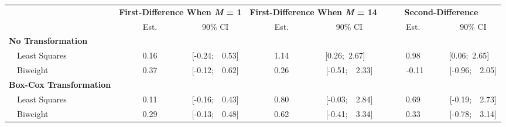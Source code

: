 %
\begin{center}
\begin{tabular}{|l||c|c||c|c||c|c|} \hline
\multicolumn{1}{|l||}{\bf }&\multicolumn{2}{c||}{\bf First-Difference When \textit{M} = 1}&\multicolumn{2}{c||}{\bf First-Difference When \textit{M} = 14}&\multicolumn{2}{c|}{\bf Second-Difference}\\ \cline{2-7}
\multicolumn{1}{|l||}{}&\multicolumn{1}{c|}{Est.}&\multicolumn{1}{c||}{90\% CI}&\multicolumn{1}{c|}{Est.}&\multicolumn{1}{c||}{90\% CI}&\multicolumn{1}{c|}{Est.}&\multicolumn{1}{c|}{90\% CI}\\ \hline
{\bf No Transformation}&&&&&&\\
~~Least Squares&~~~~~0.16~~~~~&[-0.24;~~0.53]&~~~~~1.14~~~~~&[0.26;~2.67]~~&~~~~~0.98~~~~~&[0.06;~2.65]~~\\ 
~~Biweight&~~~~~0.37~~~~~&[-0.12;~~0.62]&~~~~~0.26~~~~~&[-0.51;~~2.33]&~~~~~-0.11~~~~&[-0.96;~~2.05]\\ \hline
{\bf Box-Cox Transformation}&&&&&&\\
~~Least Squares&~~~~~0.11~~~~~&[-0.16;~~0.43]&~~~~~0.80~~~~~&[-0.03;~~2.84]&~~~~~0.69~~~~~&[-0.19;~~2.73]\\ 
~~Biweight&~~~~~0.29~~~~~&[-0.13;~~0.48]&~~~~~0.62~~~~~&[-0.41;~~3.34]&~~~~~0.33~~~~~&[-0.78;~~3.14]\\ 
\hline
\end{tabular}
\end{center}
